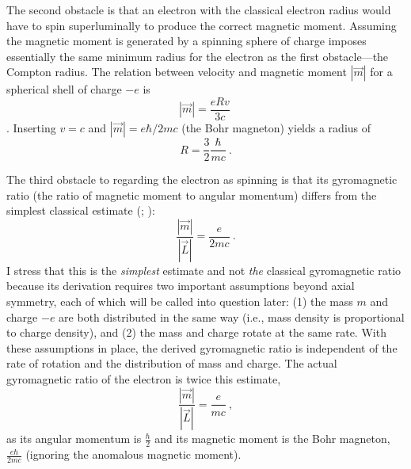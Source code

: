 \documentclass[12pt,secnumarabic,amsmath,amssymb,balancelastpage,nofootinbib]{article}
\begin{document}
The second obstacle is that an electron with the classical electron radius would have to spin superluminally to produce the correct magnetic moment.  Assuming the magnetic moment is generated by a spinning sphere of charge imposes essentially the same minimum radius for the electron as the first obstacle---the Compton radius.  The relation between velocity and magnetic moment $|\vec{m}|$ for a spherical shell of charge $-e$ is
\begin{equation}
|\vec{m}| = \frac{e R v}{3 c}\ 
\end{equation}
\citep[pg.\ 127]{rohrlich}.  Inserting $v=c$ and $|\vec{m}|={e \hbar}/{2 m c}$ (the Bohr magneton) yields a radius of
\begin{equation}
R=\frac{3}{2}\frac{\hbar}{m c}\ .
\end{equation}

The third obstacle to regarding the electron as spinning is that its gyromagnetic ratio (the ratio of magnetic moment to angular momentum) differs from the simplest classical estimate (\citealp[problem 5.56]{griffiths}; \citealp[pg.\ 187]{jackson}):
\begin{equation}
\frac{|\vec{m}|}{|\vec{L}|}=\frac{e}{2 m c}\ .
\label{classicalGR}
\end{equation}
I stress that this is the \emph{simplest} estimate and not \emph{the} classical gyromagnetic ratio because its derivation requires two important assumptions beyond axial symmetry, each of which will be called into question later: (1) the mass $m$ and charge $-e$ are both distributed in the same way (i.e., mass density is proportional to charge density), and (2) the mass and charge rotate at the same rate.  With these assumptions in place, the derived gyromagnetic ratio is independent of the rate of rotation and the distribution of mass and charge.  The actual gyromagnetic ratio of the electron is twice this estimate,
\begin{equation}
\frac{|\vec{m}|}{|\vec{L}|}=\frac{e}{m c}\ ,
\label{quantumGR}
\end{equation}
as its angular momentum is $\frac{\hbar}{2}$ and its magnetic moment is the Bohr magneton, $\frac{e \hbar}{2 m c}$ (ignoring the anomalous magnetic moment).
\end{document}
